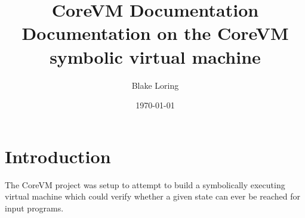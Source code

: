 \documentclass{article}
\title{CoreVM Documentation \\ \large Documentation on the CoreVM symbolic virtual machine}
\author{Blake Loring}
\date{\today}
\begin{document}
\maketitle

\section* {Introduction}

The CoreVM project was setup to attempt to build a symbolically executing virtual machine which could verify whether a given
state can ever be reached for input programs.
\end{document}
